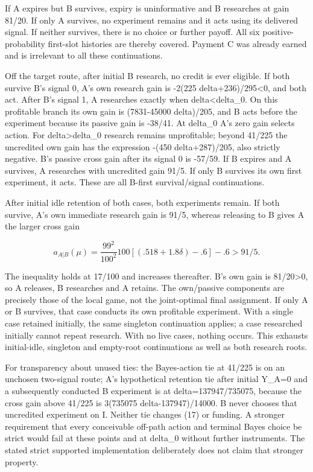 \documentclass[
  11pt,
]{article}
\begin{document}
If A expires but B survives, expiry is uninformative and B researches at
gain 81/20. If only A survives, no experiment remains and it acts using
its delivered signal. If neither survives, there is no choice or further
payoff. All six positive-probability first-slot histories are thereby
covered. Payment C was already earned and is irrelevant to all these
continuations.

Off the target route, after initial B research, no credit is ever
eligible. If both survive B's signal 0, A's own research gain is -2(225
delta+236)/295\textless0, and both act. After B's signal 1, A researches
exactly when delta\textless delta\_0. On this profitable branch its own
gain is (7831-45000 delta)/205, and B acts before the experiment because
its passive gain is -38/41. At delta\_0 A's zero gain selects action.
For delta\textgreater delta\_0 research remains unprofitable; beyond
41/225 the uncredited own gain has the expression -(450 delta+287)/205,
also strictly negative. B's passive cross gain after its signal 0 is
-57/59. If B expires and A survives, A researches with uncredited gain
91/5. If only B survives its own first experiment, it acts. These are
all B-first survival/signal continuations.

After initial idle retention of both cases, both experiments remain. If
both survive, A's own immediate research gain is 91/5, whereas releasing
to B gives A the larger cross gain

\[a_{A|B}(\mu)=\frac{99^2}{100^2}100[(.518+1.8\delta)-.6]-.6>91/5.\]

The inequality holds at 17/100 and increases thereafter. B's own gain is
81/20\textgreater0, so A releases, B researches and A retains. The
own/passive components are precisely those of the local game, not the
joint-optimal final assignment. If only A or B survives, that case
conducts its own profitable experiment. With a single case retained
initially, the same singleton continuation applies; a case researched
initially cannot repeat research. With no live cases, nothing occurs.
This exhausts initial-idle, singleton and empty-root continuations as
well as both research roots.

For transparency about unused ties: the Bayes-action tie at 41/225 is on
an unchosen two-signal route; A's hypothetical retention tie after
initial Y\_A=0 and a subsequently conducted B experiment is at
delta=137947/735075, because the cross gain above 41/225 is 3(735075
delta-137947)/14000. B never chooses that uncredited experiment on I.
Neither tie changes (17) or funding. A stronger requirement that every
conceivable off-path action and terminal Bayes choice be strict would
fail at these points and at delta\_0 without further instruments. The
stated strict supported implementation deliberately does not claim that
stronger property.
\end{document}
